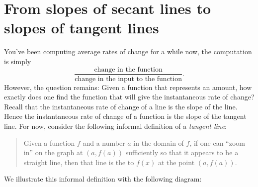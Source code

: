 \documentclass{ximera}
\begin{document}
\section{From slopes of secant lines to slopes of tangent lines}

You've been computing average rates of change for a while now, the
computation is simply
\[
\frac{\text{change in the function}}{\text{change in the input to the
    function}}.
\]
However, the question remains: Given a function that represents an
amount, how exactly does one find the function that will give the
instantaneous rate of change? Recall that the instantaneous rate of change
of a line is the slope of the line.  Hence the instantaneous rate of
change of a function is the slope of the tangent line. For now,
consider the following informal definition of a \textit{tangent line}:
\begin{quote}
Given a function $f$ and a number $a$ in the domain of $f$, if one can ``zoom in''
on the graph at $(a, f(a))$ sufficiently so that it appears to be a straight line,
then that line is the  to $f(x)$ at the point $(a,f(a))$.
\end{quote}
We illustrate this informal definition with the following diagram:
\end{document}
